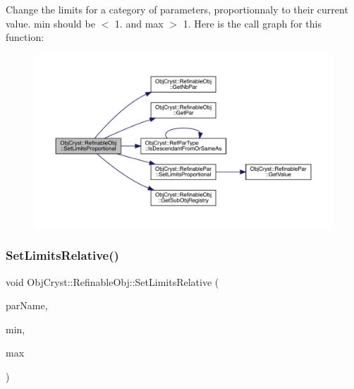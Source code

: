 Change the limits for a category of parameters, proportionnaly to their current value. min should be $<$ 1. and max $>$ 1. Here is the call graph for this function\+:
\nopagebreak
\begin{figure}[H]
\begin{center}
\leavevmode
\includegraphics[width=350pt]{class_obj_cryst_1_1_refinable_obj_a75741a3e7f7f1740243901b60f406e93_cgraph}
\end{center}
\end{figure}
\mbox{\label{class_obj_cryst_1_1_refinable_obj_acacf469614253239fdeebb21e50f0c1c}} 
\subsubsection{\texorpdfstring{SetLimitsRelative()}{SetLimitsRelative()}\hspace{0.1cm}{\footnotesize\ttfamily [1/2]}}
{\footnotesize\ttfamily void Obj\+Cryst\+::\+Refinable\+Obj\+::\+Set\+Limits\+Relative (\begin{DoxyParamCaption}\item[{const string \&}]{par\+Name,  }\item[{const R\+E\+AL}]{min,  }\item[{const R\+E\+AL}]{max }\end{DoxyParamCaption})}

